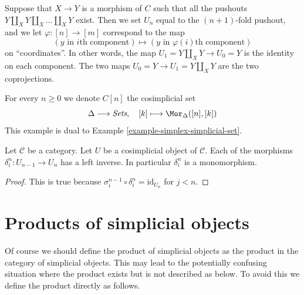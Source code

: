\begin{example}
\label{example-push-outs-simplicial-object}
Suppose that $X\to Y$ is a morphism of $C$ such that all
the pushouts $Y\amalg_X Y \amalg_X \ldots \amalg_X Y$ exist.
Then we set $U_n$ equal to the $(n + 1)$-fold pushout,
and we let $\varphi : [n] \to [m]$ correspond to the map
$$
(y \text{ in }i\text{th component})
\mapsto
(y \text{ in }\varphi(i)\text{th component})
$$
on ``coordinates''.
In other words, the map $U_1 = Y \amalg_X Y \to U_0 = Y$ is the
identity on each component.
The two maps $U_0 = Y \to U_1 = Y \amalg_X Y$ are the two coprojections.
\end{example}

\begin{example}
\label{example-simplex-cosimplicial-set}
For every $n \geq 0$ we denote $C[n]$ the cosimplicial set
$$
\Delta \longrightarrow \textit{Sets},\quad
[k] \longmapsto \Mor_{\Delta}([n], [k])
$$
This example is dual to Example \ref{example-simplex-simplicial-set}.
\end{example}

\begin{lemma}
\label{lemma-di-injective}
Let $\mathcal{C}$ be a category.
Let $U$ be a cosimplicial object of $\mathcal{C}$.
Each of the morphisms $\delta^n_i : U_{n - 1} \to U_n$
has a left inverse. In particular $\delta^n_i$ is a monomorphism.
\end{lemma}

\begin{proof}
This is true because
$\sigma_i^{n - 1} \circ \delta^n_i = \text{id}_{U_n}$
for $j < n$.
\end{proof}


























\section{Products of simplicial objects}
\label{section-products}

\noindent
Of course we should define the product of simplicial objects
as the product in the category of simplicial objects. This
may lead to the potentially confusing situation where the product exists
but is not described as below. To avoid this we define the product
directly as follows.

